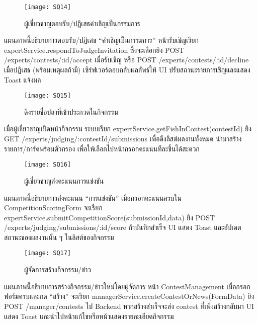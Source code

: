 \newpage

\begin{figure}[h]
	\centering
	\texttt{[image: SQ14]}
	\caption{ผู้เชี่ยวชาญตอบรับ/ปฏิเสธคำเชิญเป็นกรรมการ}
\end{figure}

\indent แผนภาพนี้อธิบายการตอบรับ/ปฏิเสธ “คำเชิญเป็นกรรมการ” หน้ารับเชิญเรียก expertService.respondToJudgeInvitation ซึ่งจะเลือกยิง POST /experts/contests/:id/accept เมื่อรับเชิญ หรือ POST /experts/contests/:id/decline เมื่อปฏิเสธ (พร้อมเหตุผลถ้ามี) เซิร์ฟเวอร์ตอบกลับผลลัพธ์ให้ UI ปรับสถานะรายการเชิญและแสดง Toast แจ้งผล

\vspace{\baselineskip}

\begin{figure}[h]
	\centering
	\texttt{[image: SQ15]}
	\caption{ดึงรายชื่อปลาที่เข้าประกวดในกิจกรรม}
\end{figure}

\indent เมื่อผู้เชี่ยวชาญเปิดหน้ากิจกรรม ระบบเรียก expertService.getFishInContest(contestId) ยิง GET /experts/judging/:contestId/submissions เพื่อดึงลิสต์ผลงานทั้งหมด นำมาสร้างรายการ/การ์ดพร้อมตัวกรอง เพื่อให้เลือกไปหน้ากรอกคะแนนทีละชิ้นได้สะดวก

\newpage

\begin{figure}[h]
	\centering
	\texttt{[image: SQ16]}
	\caption{ผู้เชี่ยวชาญส่งคะแนนการแข่งขัน}
\end{figure}

\indent แผนภาพนี้อธิบายการส่งคะแนน “การแข่งขัน” เมื่อกรอกคะแนนครบใน CompetitionScoringForm จะเรียก expertService.submitCompetitionScore(submissionId,data) ยิง POST /experts/judging/submissions/:id/score ถ้าบันทึกสำเร็จ UI แสดง Toast และอัปเดตสถานะของผลงานนั้น ๆ ในลิสต์ของกิจกรรม

\vspace{\baselineskip}

\begin{figure}[h]
	\centering
	\texttt{[image: SQ17]}
	\caption{ผู้จัดการสร้างกิจกรรม/ข่าว}
\end{figure}

\indent แผนภาพนี้อธิบายการสร้างกิจกรรม/ข่าวใหม่โดยผู้จัดการ หน้า ContestManagement เมื่อกรอกฟอร์มครบและกด “สร้าง” จะเรียก managerService.createContestOrNews(FormData) ยิง POST /manager/contests ไป Backend หากสร้างสำเร็จจะส่ง contest ที่เพิ่งสร้างกลับมา UI แสดง Toast และนำไปหน้าแก้ไขหรือหน้าแสดงรายละเอียดกิจกรรม

